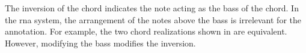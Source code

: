
The inversion of the chord indicates the note acting as the
bass of the chord. In the \gls{rna} system, the arrangement
of the notes above the bass is irrelevant for the
annotation. For example, the two chord realizations shown in
 are equivalent. However, modifying the
bass modifies the inversion.

